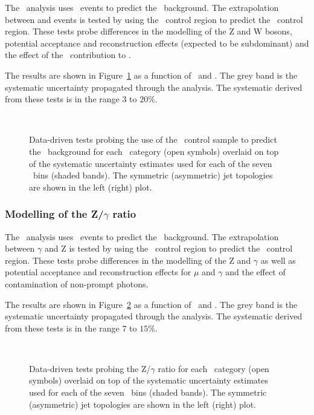 The \alphat~analysis uses \mj~events to predict the \zj~background. The extrapolation 
between \wj and \zj events is tested by using the \mj~control region to predict the \mmj~control region.
These tests probe differences in the modelling of the Z and W bosons, potential acceptance and
reconstruction effects (expected to be subdominant) and the effect of 
the \ttbar~contribution to \mj.

The results are shown in Figure~\ref{fig:closureMuToMuMu} as a function of \scalht~and \njet. 
The grey band is the systematic uncertainty propagated through the analysis. 
The systematic derived from these tests is
in the range $3$ to $20\%$.

\begin{figure}[h!]
  \begin{center}
    ~~
    \caption{Data-driven tests probing the use of the \mj~control sample
      to predict the \zj~background for each
      \njet~category (open symbols) overlaid on top of the systematic
      uncertainty estimates used for each of the seven \scalht~bins (shaded bands).  
      The symmetric (asymmetric) jet topologies are shown in the left (right) plot. 
    }
    \label{fig:closureMuToMuMu}
  \end{center} 
\end{figure}
\subsubsection{Modelling of the Z/$\gamma$ ratio}

The \alphat~analysis uses \gj~events to predict the \zj~background. The extrapolation 
between $\gamma$ and Z is tested by using the \gj~control region to predict the \mmj~control region.
These tests probe differences in the modelling of the Z and $\gamma$ as well as potential acceptance and
reconstruction effects for $\mu$ and $\gamma$ and the effect of contamination of non-prompt photons.

The results are shown in Figure~\ref{fig:closurePhoToMuMu} as a function of \scalht~and \njet. 
The grey band is the systematic uncertainty propagated through the analysis. 
The systematic derived from these tests is in the range $7$ to $15\%$.


\begin{figure}[h!]
  \begin{center}
    ~~
    \caption{Data-driven tests probing the Z/$\gamma$ ratio for each
      \njet~category (open symbols) overlaid on top of the systematic
      uncertainty estimates used for each of the seven \scalht~bins
      (shaded bands). 
      The symmetric (asymmetric) jet topologies are shown in the left (right) plot.      
    }
    \label{fig:closurePhoToMuMu}
  \end{center} 
\end{figure}

